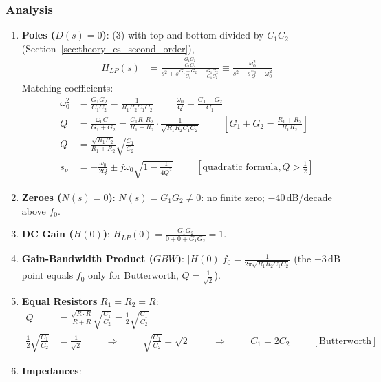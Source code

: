 \subsubsection{Analysis}
\begin{enumerate}
  \item \textbf{Poles (\(D(s) = 0\))}: (3) with top and bottom divided by \(C_1 C_2\)
    (Section~\ref{sec:theory_cs_second_order}),
    \begin{align*}
      H_{LP}(s) &= \frac{\frac{G_1 G_2}{C_1 C_2}}{s^2 + s\frac{G_1 + G_2}{C_1} + \frac{G_1 G_2}{C_1 C_2}}
      \equiv \frac{\omega_0^2}{s^2 + s\frac{\omega_0}{Q} + \omega_0^2}
    \end{align*}
    Matching coefficients:
    \begin{align*}
      \omega_0^2 &= \frac{G_1 G_2}{C_1 C_2} = \frac{1}{R_1 R_2 C_1 C_2} \hspace{1cm} \frac{\omega_0}{Q} = \frac{G_1 + G_2}{C_1} \\
      Q &= \frac{\omega_0 C_1}{G_1 + G_2} = \frac{C_1 R_1 R_2}{R_1 + R_2}\cdot\frac{1}{\sqrt{R_1 R_2 C_1 C_2}} \hspace{1cm} \left[G_1 + G_2 = \tfrac{R_1 + R_2}{R_1 R_2}\right] \\
      Q &= \frac{\sqrt{R_1 R_2}}{R_1 + R_2}\sqrt{\frac{C_1}{C_2}} \\
      s_p &= -\frac{\omega_0}{2Q} \pm j\omega_0\sqrt{1 - \frac{1}{4Q^2}} \hspace{1cm} [\text{quadratic formula}, Q > \tfrac{1}{2}]
    \end{align*}
  \item \textbf{Zeroes (\(N(s) = 0\))}: \(N(s) = G_1 G_2 \neq 0\): no finite zero; \(-40\,\)dB/decade above \(f_0\).
  \item \textbf{DC Gain (\(H(0)\))}: \(H_{LP}(0) = \frac{G_1 G_2}{0 + 0 + G_1 G_2} = 1\).
  \item \textbf{Gain-Bandwidth Product (\(GBW\))}: \(|H(0)| f_0 = \frac{1}{2\pi\sqrt{R_1 R_2 C_1 C_2}}\) (the \(-3\,\)dB
    point equals \(f_0\) only for Butterworth, \(Q = \frac{1}{\sqrt{2}}\)).
  \item \textbf{Equal Resistors} \(R_1 = R_2 = R\):
    \begin{align*}
      Q &= \frac{\sqrt{R \cdot R}}{R + R}\sqrt{\frac{C_1}{C_2}} = \frac{1}{2}\sqrt{\frac{C_1}{C_2}} \\
      \frac{1}{2}\sqrt{\frac{C_1}{C_2}} &= \frac{1}{\sqrt{2}} \hspace{1cm} \Rightarrow \hspace{1cm} \sqrt{\frac{C_1}{C_2}} = \sqrt{2} \hspace{1cm} \Rightarrow \hspace{1cm} C_1 = 2 C_2 \hspace{1cm} [\text{Butterworth}]
    \end{align*}
  \item \textbf{Impedances}:

\end{enumerate}
